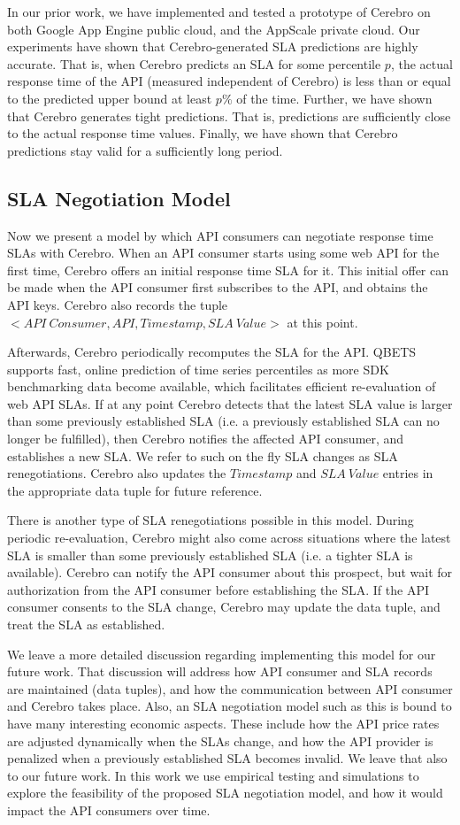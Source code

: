 In our prior work, we have implemented and tested a prototype of Cerebro on both Google 
App Engine public cloud, and the AppScale private cloud.
Our experiments have shown that Cerebro-generated SLA predictions are highly accurate. That is, when 
Cerebro predicts an SLA for some percentile $p$, the actual response time of the API (measured
independent of Cerebro) is less
than or equal to the predicted upper bound at least $p\%$ of the time. Further, we have shown that Cerebro
generates tight predictions. That is, predictions are sufficiently close to the actual response time
values. Finally, we have shown that Cerebro predictions stay valid for a sufficiently long period.  

\subsection{SLA Negotiation Model}
Now we present a model by which API consumers can negotiate response time SLAs with Cerebro.
When an API consumer starts using some web API for the first time, Cerebro offers an initial response
time SLA for it. This initial offer can be made when the API consumer first subscribes to the API, and 
obtains the API keys. Cerebro also records the tuple $<API\ Consumer, API, Timestamp, SLA\ Value>$
at this point. 

Afterwards, Cerebro periodically recomputes the SLA for the API. QBETS supports fast,
online prediction of time series percentiles as more SDK benchmarking data become available, which
facilitates efficient re-evaluation of web API SLAs. If at any point Cerebro detects that the latest SLA value
is larger than some previously established SLA (i.e. a previously established SLA can no longer be
fulfilled), then Cerebro notifies the affected API consumer, and establishes a new SLA. We refer to such on the fly
SLA changes as SLA renegotiations. Cerebro also updates the $Timestamp$ and $SLA\ Value$
entries in the appropriate data tuple for future reference.

There is another type of SLA renegotiations possible in this model.
During periodic re-evaluation, Cerebro might also come across situations where the latest SLA is smaller
than some previously established SLA (i.e. a tighter SLA is available). Cerebro can notify the 
API consumer about this prospect, but wait for authorization from the API consumer before 
establishing the SLA. If the API consumer consents to the SLA change, Cerebro may update the
data tuple, and treat the SLA as established.

We leave a more detailed discussion regarding implementing this model for our future work. That 
discussion will address how API consumer and SLA records are maintained (data tuples), and
how the communication between API consumer and Cerebro takes place. Also, an SLA negotiation
model such as this is bound to have many interesting economic aspects. These include how the
API price rates are adjusted dynamically when the SLAs change, and how the API provider is penalized
when a previously established SLA becomes invalid. We leave that also to our future work. In this work
we use empirical testing and simulations to explore the feasibility of the proposed SLA negotiation model,
and how it would impact the API consumers over time.